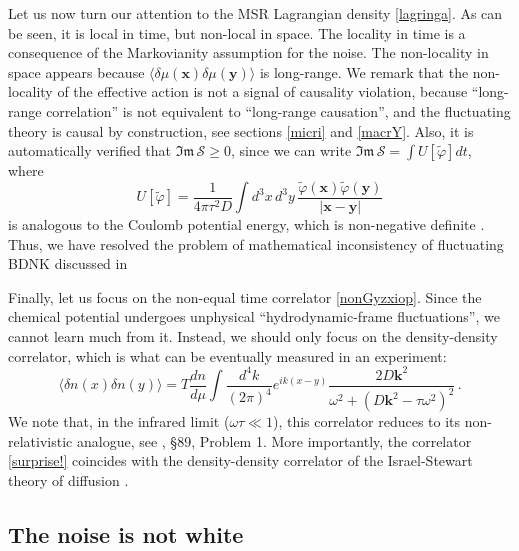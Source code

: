 \documentclass[a4paper, amsfonts, amssymb, amsmath, reprint, showkeys, nofootinbib, twoside,notitlepage,onecolumn]{revtex4-2}
\newcommand{\x}{{\textbf{x}}}
\newcommand{\y}{{\textbf{y}}}
\newcommand{\kb}{{\textbf{k}}}
\theoremstyle{definition}
\begin{document}
Let us now turn our attention to the MSR Lagrangian density \eqref{lagringa}. As can be seen, it is local in time, but non-local in space. The locality in time is a consequence of the Markovianity assumption for the noise. The non-locality in space appears because $\langle \delta \mu(\x) \delta \mu(\y) \rangle$ is long-range. We remark that the non-locality of the effective action is not a signal of causality violation, because ``long-range correlation'' is not equivalent to ``long-range causation'', and the fluctuating theory is causal by construction, see sections \ref{micri} and \ref{macrY}. Also, it is automatically verified that $\mathfrak{Im} \, \mathcal{S} \geq 0$, since we can write $\mathfrak{Im} \, \mathcal{S}=\int U[\tilde{\varphi}] dt$, where
\begin{equation}
    U[\tilde{\varphi}]= \dfrac{1}{4\pi \tau^2 D}\int d^3x \, d^3 y \, \dfrac{\tilde{\varphi}(\x)\tilde{\varphi}(\y)}{|\x-\y|} 
\end{equation}
is analogous to the Coulomb potential energy, which is non-negative definite \cite{jackson_classical_1999}. Thus, we have resolved the problem of mathematical inconsistency of fluctuating BDNK discussed in \cite{Mullins:2023tjg}

Finally, let us focus on the non-equal time correlator \eqref{nonGyzxiop}. Since the chemical potential undergoes unphysical ``hydrodynamic-frame fluctuations'', we cannot learn much from it. Instead, we should only focus on the density-density correlator, which is what can be eventually measured in an experiment:
\begin{equation}\label{surprise!}
    \langle \delta n(x) \delta n(y) \rangle = T \dfrac{dn}{d\mu} \int \dfrac{d^4k}{(2\pi)^4} e^{ik(x-y)} \dfrac{2D \kb^2}{\omega^2+(D\kb^2-\tau \omega^2)^2} \, .
\end{equation}
We note that, in the infrared limit ($\omega\tau \ll 1$), this correlator reduces to its non-relativistic analogue, see \cite{landau9}, \S 89, Problem 1. More importantly, the correlator \eqref{surprise!} coincides with the density-density correlator of the Israel-Stewart theory of diffusion \cite{Mullins:2023tjg}.

\subsection{The noise is not white}
\end{document}
